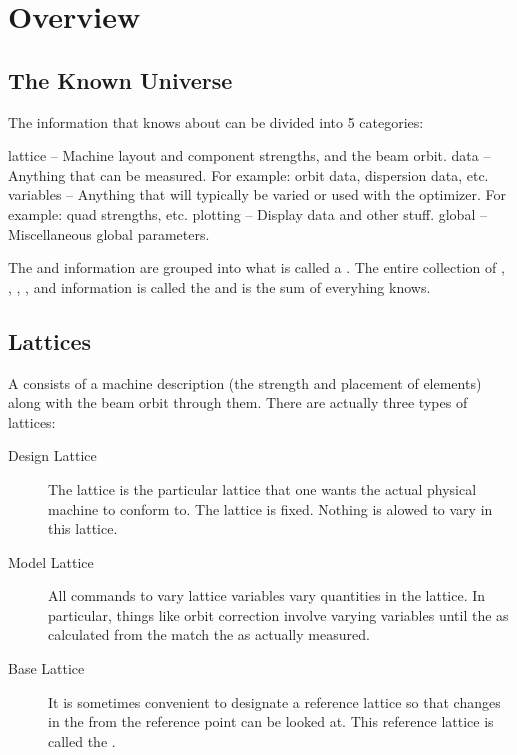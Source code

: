 \chapter{Overview}
\label{c:overview}

\section{The Known Universe}

The information that \tao knows about can be divided into 5 categories: 
\begin{example}
  lattice   -- Machine layout and component strengths, and the beam orbit.
  data      -- Anything that can be measured. 
               For example: orbit data, dispersion data, etc.
  variables -- Anything that will typically be varied or used with the optimizer. 
               For example: quad strengths, etc.
  plotting  -- Display data and other stuff.
  global    -- Miscellaneous global parameters.
\end{example}
The  and  information are grouped into what is called a
. The entire collection of , ,
, , and  information is called
the  and is the sum of everyhing \tao knows.

\section{Lattices}

A  consists of a machine description (the strength and placement of elements)
along with the beam orbit through them. There are actually three types of lattices:
  \vspace*{-3ex}
  \begin{description}
  \item[Design Lattice] \Newline 
The  lattice is the particular lattice that one wants the
actual physical machine to conform to. The  lattice is fixed. Nothing is
alowed to vary in this lattice.
  \item[Model Lattice] \Newline
All \tao commands to vary lattice variables vary quantities in the
 lattice. In particular, things like orbit correction
involve varying  variables until the  as calculated
from the  match the  as actually measured.
  \item[Base Lattice] \Newline
It is sometimes convenient to designate a reference lattice so that
changes in the  from the reference point can be looked at.
This reference lattice is called the .
  \end{description}

